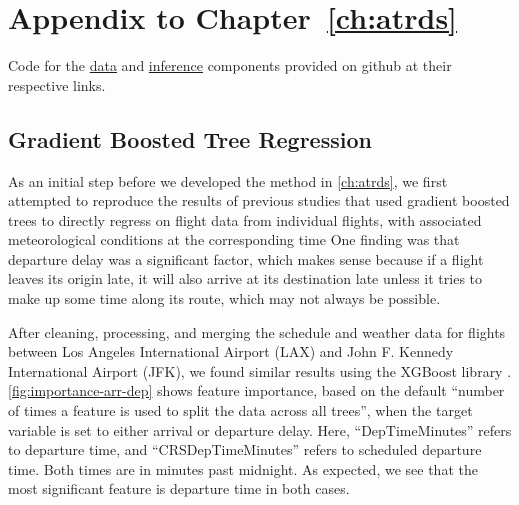 \chapter{Appendix to Chapter~\ref{ch:atrds}}
\label{app:atrds}

Code for the \href{https://github.com/jz268/atm_generative}{data} and \href{http://github.com/jz268/BayesAirATRDS2025}{inference} components provided on github at their respective links.

\section{Gradient Boosted Tree Regression}

As an initial step before we developed the method in \cref{ch:atrds}, we first attempted to reproduce the results of previous studies that used gradient boosted trees to directly regress on flight data from individual flights, with associated meteorological conditions at the corresponding time \cite{WU2022100030} One finding was that departure delay was a significant factor, which makes sense because if a flight leaves its origin late, it will also arrive at its destination late unless it tries to make up some time along its route, which may not always be possible.

After cleaning, processing, and merging the schedule and weather data for flights between Los Angeles International Airport (LAX) and John F. Kennedy International Airport (JFK), we found similar results using the XGBoost library \cite{Chen:2016:XST:2939672.2939785}. \cref{fig:importance-arr-dep} shows feature importance, based on the default ``number of times a feature is used to split the data across all trees'', when the target variable is set to either arrival or departure delay. Here, ``DepTimeMinutes'' refers to departure time, and ``CRSDepTimeMinutes'' refers to scheduled departure time. Both times are in minutes past midnight. As expected, we see that the most significant feature is departure time in both cases.

